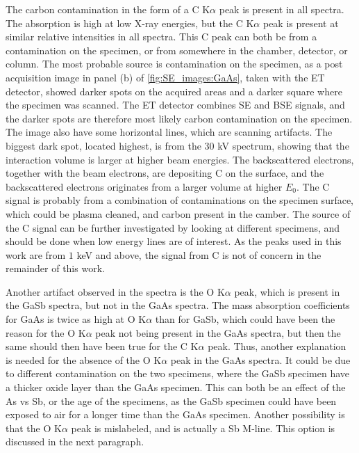 The carbon contamination in the form of a C K$\alpha$ peak is present in all spectra.
The absorption is high at low X-ray energies, but the C K$\alpha$ peak is present at similar relative intensities in all spectra.
This C peak can both be from a contamination on the specimen, or from somewhere in the chamber, detector, or column.
The most probable source is contamination on the specimen, as a post acquisition image in panel (b) of \cref{fig:SE_images:GaAs}, taken with the ET detector, showed darker spots on the acquired areas and a darker square where the specimen was scanned.
The ET detector combines SE and BSE signals, and the darker spots are therefore most likely carbon contamination on the specimen.
The image also have some horizontal lines, which are scanning artifacts.
The biggest dark spot, located highest, is from the $30$ kV spectrum, showing that the interaction volume is larger at higher beam energies.
The backscattered electrons, together with the beam electrons, are depositing C on the surface, and the backscattered electrons originates from a larger volume at higher $E_0$.
The C signal is probably from a combination of contaminations on the specimen surface, which could be plasma cleaned, and carbon present in the camber.
The source of the C signal can be further investigated by looking at different specimens, and should be done when low energy lines are of interest.
As the peaks used in this work are from $1$ keV and above, the signal from C is not of concern in the remainder of this work.


Another artifact observed in the spectra is the O K$\alpha$ peak, which is present in the GaSb spectra, but not in the GaAs spectra.
The mass absorption coefficients for GaAs is twice as high at O K$\alpha$ than for GaSb, which could have been the reason for the O K$\alpha$ peak not being present in the GaAs spectra, but then the same should then have been true for the C K$\alpha$ peak.
Thus, another explanation is needed for the absence of the O K$\alpha$ peak in the GaAs spectra.
It could be due to different contamination on the two specimens, where the GaSb specimen have a thicker oxide layer than the GaAs specimen.
This can both be an effect of the As vs Sb, or the age of the specimens, as the GaSb specimen could have been exposed to air for a longer time than the GaAs specimen.
Another possibility is that the O K$\alpha$ peak is mislabeled, and is actually a Sb M-line.
This option is discussed in the next paragraph.



